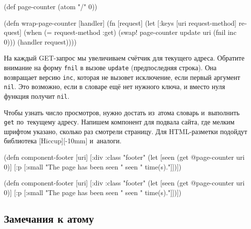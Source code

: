 \else

\begin{english}
  \begin{clojure}
(def page-counter
  (atom {"/" 0}))

(defn wrap-page-counter
  [handler]
  (fn [request]
    (let [{:keys [uri request-method]} request]
      (when (= request-method :get)
        (swap! page-counter update uri (fnil inc 0)))
      (handler request))))
  \end{clojure}
\end{english}

\fi


На каждый GET-запрос мы увеличиваем счётчик для текущего адреса. Обратите
внимание на форму \verb|fnil| в вызове \verb|update| (предпоследняя строка). Она
возвращает версию \verb|inc|, которая не вызовет исключение, если первый
аргумент \verb|nil|. Это возможно, если в словаре ещё нет нужного ключа, и
вместо нуля функция получит \verb|nil|.


Чтобы узнать число просмотров, нужно достать из~атома словарь и~выполнить
\verb|get| по~текущему адресу. Напишем компонент для подвала сайта, где мелким
шрифтом указано, сколько раз смотрели страницу. Для HTML-разметки подойдут
библиотека [Hiccup][-10mm]
и~аналоги.

\ifnarrow

\begin{english}
  \begin{clojure}
(defn component-footer [uri]
  [:div {:class "footer"}
   (let [seen (get @page-counter uri 0)]
     [:p [:small
          "The page has been seen " seen
          " time(s)."]])])
  \end{clojure}
\end{english}

\else

\begin{english}
  \begin{clojure}
(defn component-footer [uri]
  [:div {:class "footer"}
   (let [seen (get @page-counter uri 0)]
     [:p [:small "The page has been seen "
                 seen
                 " time(s)."]])])
  \end{clojure}
\end{english}

\fi

\subsection{Замечания к атому}

